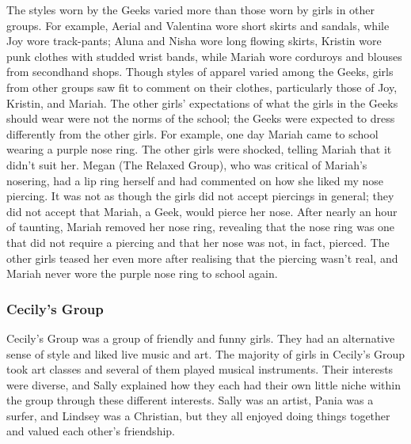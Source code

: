 The styles worn by the Geeks varied more than those worn by girls in other groups.  For example, Aerial and Valentina wore short skirts and sandals, while Joy wore track-pants; Aluna and Nisha wore long flowing skirts, Kristin wore punk clothes with studded wrist bands, while Mariah wore corduroys and blouses from secondhand shops.  Though styles of apparel varied among the Geeks, girls from other groups saw fit to comment on their clothes, particularly those of Joy, Kristin, and Mariah. The other girls' expectations of what the girls in the Geeks should wear were not the norms of the school; the Geeks were expected to dress differently from the other girls.  For example, one day Mariah came to school wearing a purple nose ring.  The other girls were shocked, telling Mariah that it didn't suit her.  Megan (The Relaxed Group), who was critical of Mariah's nosering, had a lip ring herself and had commented on how she liked my nose piercing.  It was not as though the girls did not accept piercings in general; they did not accept that Mariah, a Geek, would pierce her nose.  After nearly an hour of taunting, Mariah removed her nose ring, revealing that the nose ring was one that did not require a piercing and that her nose was not, in fact, pierced.  The other girls teased her even more after realising that the piercing wasn't real, and Mariah never wore the purple nose ring to school again.  


\subsubsection{Cecily's Group}

Cecily's Group was a group of friendly and funny girls.  They had an alternative sense of style and liked live music and art.  The majority of girls in Cecily's Group took art classes and several of them played musical instruments. Their interests were diverse, and Sally explained how they each had their own little niche within the group through these different interests.  Sally was an artist, Pania was a surfer, and Lindsey was a Christian, but they all enjoyed doing things together and valued each other's friendship.


